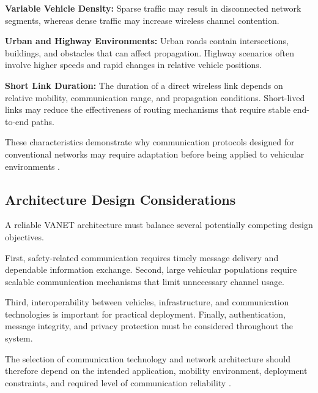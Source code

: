 \textbf{Variable Vehicle Density:}
Sparse traffic may result
in disconnected network
segments, whereas dense
traffic may increase
wireless channel contention.

\textbf{Urban and Highway Environments:}
Urban roads contain intersections,
buildings, and obstacles
that can affect propagation.
Highway scenarios often
involve higher speeds and
rapid changes in relative
vehicle positions.

\textbf{Short Link Duration:}
The duration of a direct
wireless link depends on
relative mobility,
communication range,
and propagation conditions.
Short-lived links may
reduce the effectiveness
of routing mechanisms
that require stable
end-to-end paths.

These characteristics
demonstrate why communication
protocols designed for
conventional networks
may require adaptation
before being applied
to vehicular environments
\cite{Hartenstein2008,Zeadally2012}.

\subsection{Architecture Design Considerations}
\label{sec:2F}

A reliable VANET architecture
must balance several
potentially competing
design objectives.

First, safety-related
communication requires
timely message delivery
and dependable information
exchange. Second, large
vehicular populations
require scalable
communication mechanisms
that limit unnecessary
channel usage.

Third, interoperability
between vehicles,
infrastructure, and
communication technologies
is important for
practical deployment.
Finally, authentication,
message integrity,
and privacy protection
must be considered
throughout the system.

The selection of
communication technology
and network architecture
should therefore depend
on the intended application,
mobility environment,
deployment constraints,
and required level
of communication reliability
\cite{Karagiannis2011,Zeadally2012}.
